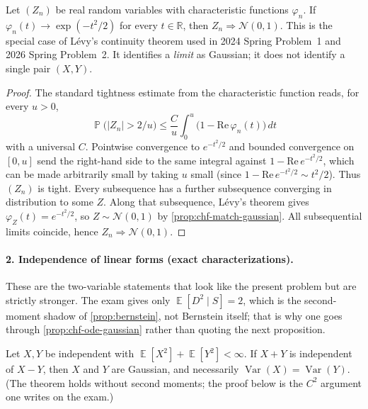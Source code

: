 \documentclass[11pt,a4paper]{article}
\DeclareMathOperator{\Var}{Var}
\DeclareMathOperator{\E}{\mathbb{E}}
\DeclareMathOperator{\Pbb}{\mathbb{P}}
\begin{document}
\begin{proposition}
\label{prop:levy-gaussian}
Let \( (Z_n) \) be real random variables with characteristic functions \( \varphi_n \). If \( \varphi_n(t)\to\exp(-t^{2}/2) \) for every \( t\in\mathbb{R} \), then \( Z_n\Rightarrow\mathcal{N}(0,1) \). This is the special case of Lévy's continuity theorem \citep[Theorem~3.3.6]{durrett2010} used in 2024 Spring Problem~1 and 2026 Spring Problem~2. It identifies a \emph{limit} as Gaussian; it does not identify a single pair \( (X,Y) \).
\end{proposition}

\begin{proof}
The standard tightness estimate from the characteristic function \citep[\S3.3]{durrett2010} reads, for every \( u>0 \),
\[
\Pbb\bigl(|Z_n|>2/u\bigr)
\le
\frac{C}{u}\int_{0}^{u}\bigl(1-\mathrm{Re}\,\varphi_n(t)\bigr)\,dt
\]
with a universal \( C \). Pointwise convergence to \( e^{-t^{2}/2} \) and bounded convergence on \( [0,u] \) send the right-hand side to the same integral against \( 1-\mathrm{Re}\,e^{-t^{2}/2} \), which can be made arbitrarily small by taking \( u \) small (since \( 1-\mathrm{Re}\,e^{-t^{2}/2}\sim t^{2}/2 \)). Thus \( (Z_n) \) is tight. Every subsequence has a further subsequence converging in distribution to some \( Z \). Along that subsequence, Lévy's theorem gives \( \varphi_Z(t)=e^{-t^{2}/2} \), so \( Z\sim\mathcal{N}(0,1) \) by \cref{prop:chf-match-gaussian}. All subsequential limits coincide, hence \( Z_n\Rightarrow\mathcal{N}(0,1) \).
\end{proof}

\paragraph{2. Independence of linear forms (exact characterizations).}

These are the two-variable statements that look like the present problem but are strictly stronger. The exam gives only \( \E[D^{2}\mid S]=2 \), which is the second-moment shadow of \cref{prop:bernstein}, not Bernstein itself; that is why one goes through \cref{prop:chf-ode-gaussian} rather than quoting the next proposition.

\begin{proposition}[Bernstein]
\label{prop:bernstein}
Let \( X,Y \) be independent with \( \E[X^{2}]+\E[Y^{2}]<\infty \). If \( X+Y \) is independent of \( X-Y \), then \( X \) and \( Y \) are Gaussian, and necessarily \( \Var(X)=\Var(Y) \). (The theorem holds without second moments; the proof below is the \( C^{2} \) argument one writes on the exam.)
\end{proposition}
\end{document}
